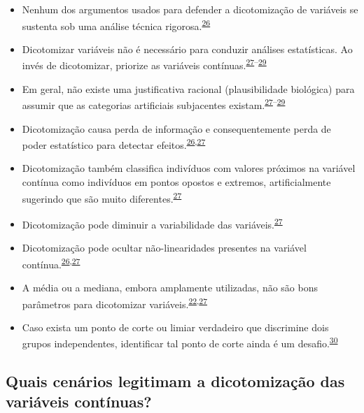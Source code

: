 \documentclass[
]{book}
\begin{document}
\begin{itemize}
\item
  Nenhum dos argumentos usados para defender a dicotomização de variáveis se sustenta sob uma análise técnica rigorosa.\textsuperscript{\protect\hyperlink{ref-MacCallum2002}{26}}
\item
  Dicotomizar variáveis não é necessário para conduzir análises estatísticas. Ao invés de dicotomizar, priorize as variáveis contínuas.\textsuperscript{\protect\hyperlink{ref-Altman2006}{27}--\protect\hyperlink{ref-Collins2016}{29}}
\item
  Em geral, não existe uma justificativa racional (plausibilidade biológica) para assumir que as categorias artificiais subjacentes existam.\textsuperscript{\protect\hyperlink{ref-Altman2006}{27}--\protect\hyperlink{ref-Collins2016}{29}}
\item
  Dicotomização causa perda de informação e consequentemente perda de poder estatístico para detectar efeitos.\textsuperscript{\protect\hyperlink{ref-MacCallum2002}{26},\protect\hyperlink{ref-Altman2006}{27}}
\item
  Dicotomização também classifica indivíduos com valores próximos na variável contínua como indivíduos em pontos opostos e extremos, artificialmente sugerindo que são muito diferentes.\textsuperscript{\protect\hyperlink{ref-Altman2006}{27}}
\item
  Dicotomização pode diminuir a variabilidade das variáveis.\textsuperscript{\protect\hyperlink{ref-Altman2006}{27}}
\item
  Dicotomização pode ocultar não-linearidades presentes na variável contínua.\textsuperscript{\protect\hyperlink{ref-MacCallum2002}{26},\protect\hyperlink{ref-Altman2006}{27}}
\item
  A média ou a mediana, embora amplamente utilizadas, não são bons parâmetros para dicotomizar variáveis.\textsuperscript{\protect\hyperlink{ref-Fedorov2009}{22},\protect\hyperlink{ref-Altman2006}{27}}
\item
  Caso exista um ponto de corte ou limiar verdadeiro que discrimine dois grupos independentes, identificar tal ponto de corte ainda é um desafio.\textsuperscript{\protect\hyperlink{ref-Prince2017}{30}}
\end{itemize}

\hypertarget{quais-cenuxe1rios-legitimam-a-dicotomizauxe7uxe3o-das-variuxe1veis-contuxednuas}{%
\subsection{Quais cenários legitimam a dicotomização das variáveis contínuas?}\label{quais-cenuxe1rios-legitimam-a-dicotomizauxe7uxe3o-das-variuxe1veis-contuxednuas}}
\end{document}
